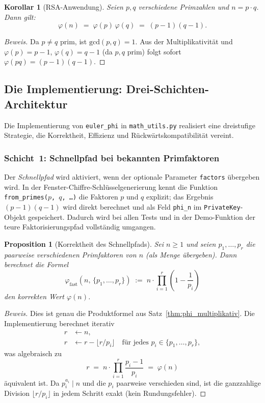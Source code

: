 ﻿\documentclass[12pt, a4paper]{article}
\theoremstyle{plain}
\newtheorem{corollary}[theorem]{Korollar}
\newtheorem{proposition}[theorem]{Proposition}
\theoremstyle{definition}
\theoremstyle{remark}
\newenvironment{myproof}[1][Beweis]{%
  \begin{proof}[#1]
}{%
  \end{proof}
}
\newcommand{\GCD}{\mathrm{gcd}}
\begin{document}
\begin{corollary}[RSA-Anwendung]\label{cor:phi_rsa}
  Seien $p, q$ verschiedene Primzahlen und $n = p \cdot q$. Dann gilt:
  \[
    \varphi(n) \;=\; \varphi(p)\,\varphi(q) \;=\; (p-1)(q-1).
  \]
\end{corollary}

\begin{myproof}
  Da $p \ne q$ prim, ist $\GCD(p, q) = 1$. Aus der Multiplikativit\"at
  und $\varphi(p) = p-1$, $\varphi(q) = q-1$ (da $p, q$ prim) folgt
  sofort $\varphi(pq) = (p-1)(q-1)$.
\end{myproof}

\subsection{Die Implementierung: Drei-Schichten-Architektur}
\label{subsec:phi_implementierung}

Die Implementierung von \texttt{euler\_phi} in \texttt{math\_utils.py}
realisiert eine dreistufige Strategie, die Korrektheit, Effizienz und
R\"uckw\"artskompatibilit\"at vereint.

\subsubsection{Schicht~1: Schnellpfad bei bekannten Primfaktoren}

Der \emph{Schnellpfad} wird aktiviert, wenn der optionale Parameter
\texttt{factors} \"ubergeben wird. In der Fenster-Chiffre-Schl\"usselgenerierung
kennt die Funktion \texttt{from\_primes($p$, $q$, \ldots)} die Faktoren $p$ und $q$
explizit; das Ergebnis $(p-1)(q-1)$ wird direkt berechnet und als
Feld \texttt{phi\_n} im \texttt{PrivateKey}-Objekt gespeichert.
Dadurch wird bei allen Tests und in der Demo-Funktion der teure
Faktorisierungspfad vollst\"andig umgangen.

\begin{proposition}[Korrektheit des Schnellpfads]\label{prop:schnellpfad}
  Sei $n \ge 1$ und seien $p_1, \ldots, p_r$ die \emph{paarweise verschiedenen}
  Primfaktoren von $n$ (als Menge \"ubergeben). Dann berechnet die Formel
  \[
    \varphi_{\mathrm{fast}}(n,\, \{p_1,\ldots,p_r\})
    \;:=\; n \cdot \prod_{i=1}^{r} \!\left(1 - \frac{1}{p_i}\right)
  \]
  den korrekten Wert $\varphi(n)$.
\end{proposition}

\begin{myproof}
  Dies ist genau die Produktformel aus Satz~\ref{thm:phi_multiplikativ}.
  Die Implementierung berechnet iterativ
  \begin{align*}
    r &\leftarrow n, \\
    r &\leftarrow r - \lfloor r / p_i \rfloor \quad \text{f\"ur jedes } p_i \in \{p_1,\ldots,p_r\},
  \end{align*}
  was algebraisch zu
  \[
    r \;=\; n \cdot \prod_{i=1}^r \frac{p_i - 1}{p_i} \;=\; \varphi(n)
  \]
  \"aquivalent ist. Da $p_i^{a_i} \mid n$ und die $p_i$ paarweise
  verschieden sind, ist die ganzzahlige Division $\lfloor r/p_i \rfloor$
  in jedem Schritt exakt (kein Rundungsfehler).
\end{myproof}
\end{document}
